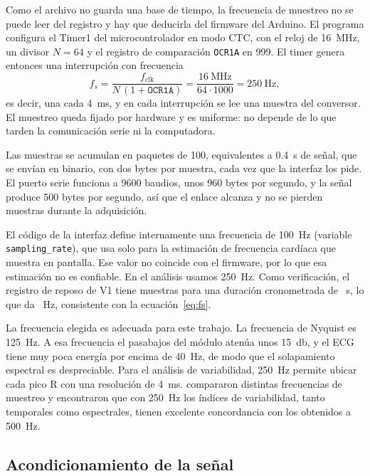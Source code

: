 Como el archivo no guarda una base de tiempo, la frecuencia de muestreo no se puede leer del registro y hay que deducirla del firmware del Arduino. El programa configura el Timer1 del microcontrolador en modo CTC, con el reloj de \SI{16}{\mega\hertz}, un divisor $N = 64$ y el registro de comparación \texttt{OCR1A} en 999. El timer genera entonces una interrupción con frecuencia
\begin{equation}
  f_s = \frac{f_\text{clk}}{N\,(1 + \texttt{OCR1A})} = \frac{\SI{16}{\mega\hertz}}{64 \cdot 1000} = \SI{250}{\hertz},
  \label{eq:fs}
\end{equation}
es decir, una cada \SI{4}{\milli\second}, y en cada interrupción se lee una muestra del conversor. El muestreo queda fijado por hardware y es uniforme: no depende de lo que tarden la comunicación serie ni la computadora.

Las muestras se acumulan en paquetes de 100, equivalentes a \SI{0.4}{\second} de señal, que se envían en binario, con dos bytes por muestra, cada vez que la interfaz los pide. El puerto serie funciona a 9600 baudios, unos 960 bytes por segundo, y la señal produce 500 bytes por segundo, así que el enlace alcanza y no se pierden muestras durante la adquisición.

El código de la interfaz define internamente una frecuencia de \SI{100}{\hertz} (variable \texttt{sampling\_rate}), que usa solo para la estimación de frecuencia cardíaca que muestra en pantalla. Ese valor no coincide con el firmware, por lo que esa estimación no es confiable. En el análisis usamos \SI{250}{\hertz}. Como verificación, el registro de reposo de V1 tiene  muestras para una duración cronometrada de ~s, lo que da ~Hz, consistente con la ecuación~\eqref{eq:fs}.

La frecuencia elegida es adecuada para este trabajo. La frecuencia de Nyquist es \SI{125}{\hertz}. A esa frecuencia el pasabajos del módulo atenúa unos \SI{15}{\decibel}, y el ECG tiene muy poca energía por encima de \SI{40}{\hertz}, de modo que el solapamiento espectral es despreciable. Para el análisis de variabilidad, \SI{250}{\hertz} permite ubicar cada pico R con una resolución de \SI{4}{\milli\second}. \textcite{kwon2018} compararon distintas frecuencias de muestreo y encontraron que con \SI{250}{\hertz} los índices de variabilidad, tanto temporales como espectrales, tienen excelente concordancia con los obtenidos a \SI{500}{\hertz}.

\subsection{Acondicionamiento de la señal}
\label{sec:met-acondicionamiento}

